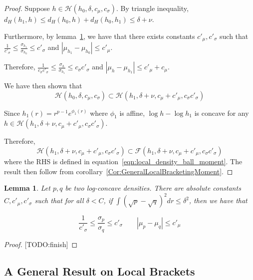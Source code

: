 \documentclass[12pt]{article}
\newtheorem{lemma}[theorem]{Lemma}
\begin{document}
\begin{proof}

  Suppose $h \in  \mathcal{H}(h_0, \delta, c_\mu, c_\sigma)$.
  By triangle inequality, $d_H(h_1, h) \leq d_H(h_0, h) + d_H(h_0, h_1) \leq \delta + \nu$.

  Furthermore, by lemma~\ref{Lem:HellingerMomentBound}, we have that there exists constants $c'_\mu, c'_\sigma$ such that
  $\frac{1}{c'_\sigma} \leq \frac{\sigma_{h_1}}{\sigma_{h_0}} \leq c'_\sigma$ and $| \mu_{h_1} - \mu_{h_0}| \leq c'_\mu$. 

  Therefore, $\frac{1}{c_\sigma c'_\sigma} \leq \frac{\sigma_h}{\sigma_{h_1}} \leq c_\sigma c'_\sigma$ and $|\mu_h - \mu_{h_1}| \leq c'_\mu + c_\mu$. 

  We have then shown that
  \[
    \mathcal{H}(h_0, \delta, c_\mu, c_\sigma) \subset \mathcal{H}(h_1, \delta + \nu, c_\mu + c'_\mu, c_\sigma c'_\sigma)
  \]

  Since $h_1(r) = r^{p-1} e^{\phi_1(r)}$ where $\phi_1$ is affine, $ \log h - \log h_1$ is concave for any $h \in  \mathcal{H}(h_1, \delta + \nu, c_\mu + c'_\mu, c_\sigma c'_\sigma)$.

  Therefore,
  \[
    \mathcal{H}(h_1, \delta + \nu, c_\mu + c'_\mu, c_\sigma c'_\sigma) \subset \mathcal{F}(h_1, \delta + \nu, c_\mu + c'_\mu, c_\sigma c'_\sigma)
  \]
  where the RHS is defined in equation~\ref{eqn:local_density_ball_moment}. The result then follow from corollary~\ref{Cor:GeneralLocalBracketingMoment}.
  
\end{proof}

\begin{lemma}
  \label{Lem:HellingerMomentBound}
  Let $p, q$ be two log-concave densities. There are absolute constants $C, c'_\mu, c'_\sigma$ such that for all $\delta < C$, if $\int (\sqrt{p} - \sqrt{q})^2 dr \leq \delta^2$, then we have that

  \[
    \frac{1}{c'_\sigma} \leq \frac{\sigma_p}{\sigma_q} \leq c'_\sigma
    \qquad
    |\mu_p - \mu_q| \leq c'_\mu
  \]
  
\end{lemma}

\begin{proof}

  [TODO:finish]

\end{proof}


\subsection{A General Result on Local Brackets}
\end{document}
